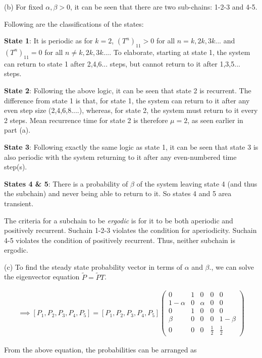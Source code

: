 (b) For fixed $\alpha , \beta > 0$, it can be seen that there are two sub-chains: 1-2-3 and 4-5.

Following are the classifications of the states:

\textbf{State 1}: It is periodic as for $k = 2$, $(T^n)_{11} > 0$ for all $n = k,2k,3k...$ and $(T^n)_{11} = 0$ for all $n \neq k,2k,3k...$. To elaborate, starting at state 1, the system can return to state 1 after 2,4,6... steps, but cannot return to it after 1,3,5... steps.

\textbf{State 2}: Following the above logic, it can be seen that state 2 is recurrent. The difference from state 1 is that, for state 1, the system can return to it after any even step size (2,4,6,8....), whereas, for state 2, the system must return to it every 2 steps. Mean recurrence time for state 2 is therefore $\mu=2$, as seen earlier in part (a).

\textbf{State 3}: Following exactly the same logic as state 1, it can be seen that state 3 is also periodic with the system returning to it after any even-numbered time step(s).

\textbf{States 4 \& 5}: There is a probability of $\beta$ of the system leaving state 4 (and thus the subchain) and never being able to return to it. So states  4 and 5 area transient.

The criteria for a subchain to be \textit{ergodic} is for it to be both aperiodic and positively recurrent. Suchain 1-2-3 violates the condition for aperiodicity. Suchain 4-5 violates the condition of positively recurrent. Thus, neither subchain is ergodic.

(c) To find the steady state probability vector in terms of $\alpha$ and $\beta$., we can solve the eigenvector equation $\tilde{P} = \tilde{P}T$.

\begin{gather*}
\implies [P_1 , P_2 , P_3 , P_4 , P_5] = [P_1 , P_2 , P_3 , P_4 , P_5] \begin{pmatrix}
  0 & 1 & 0 & 0 & 0 \\
  1-\alpha & 0 & \alpha & 0 & 0 \\
  0 & 1 & 0 & 0 & 0 \\
  \beta & 0 & 0 & 0 & 1-\beta \\
  0 & 0 & 0 & \frac{1}{2} & \frac{1}{2}
\end{pmatrix}
\end{gather*}

From the above equation, the probabilities can be arranged as

